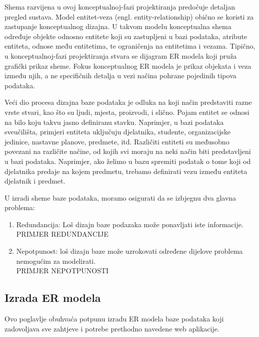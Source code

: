 \documentclass[times, utf8, zavrsni]{fer}
\begin{document}
Shema razvijena u ovoj konceptualnoj-fazi projektiranja predočuje detaljan pregled sustava. Model entitet-veza (engl. entity-relationship) obično se koristi za zastupanje konceptualnog dizajna. U takvom modelu konceptualna shema određuje objekte odnosno entitete koji su zastupljeni u bazi podataka, atribute entiteta, odnose među entitetima, te ograničenja na entitetima i vezama. Tipično, u konceptualnoj-fazi projektiranja stvara se dijagram ER modela koji pruža grafički prikaz sheme. Fokus konceptualnog ER modela je prikaz objekata i veza između njih, a ne specifičnih detalja u vezi načina pohrane pojedinih tipova podataka.

Veći dio procesa dizajna baze podataka je odluka na koji način predstaviti razne vrste stvari, kao što su ljudi, mjesta, proizvodi, i slično. Pojam entitet se odnosi na bilo koju takvu jasno definiranu stavku. Naprimjer, u bazi podataka sveučilišta, primjeri entiteta uključuju djelatnika, studente, organizacijske jedinice, nastavne planove, predmete, itd. Različiti entiteti su međusobno povezani na različite načine, od kojih svi moraju na neki način biti predstavljeni u bazi podataka. Naprimjer, ako želimo u bazu spremiti podatak o tome koji od djelatnika predaje na kojem predmetu, trebamo definirati vezu između entiteta djelatnik i predmet.\clearpage

U izradi sheme baze podataka, moramo osigurati da se izbjegnu dva glavna problema:
\begin{enumerate}
\item Redundancija: Loš dizajn baze podazaka može ponavljati iste informacije.\\
PRIMJER REDUNDANCIJE
\item Nepotpunost: loš dizajn baze može uzrokovati određene dijelove problema nemogućim za modelirati.\\
PRIMJER NEPOTPUNOSTI
\end{enumerate}

\subsection{Izrada ER modela}

Ovo poglavlje obuhvaća potpunu izradu ER modela baze podataka koji zadovoljava sve zahtjeve i potrebe prethodno navedene web aplikacije.
\end{document}
